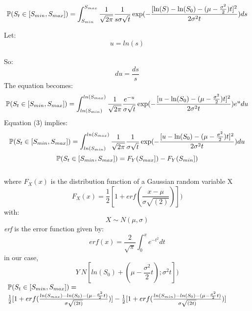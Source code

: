 \documentclass[12pt]{article}
\begin{document}
					\begin{equation}
						\mathbb{P}(S_t \in [S_{min},S_{max}]) = \int_{S_{min}}^{S_{max}} \frac{1}{\sqrt{2 \pi}} \frac{1}{s\sigma \sqrt{t}} \exp(-\frac{[\ln(S)-\ln(S_0)-
							(\mu-\frac{\sigma^2}{2})t]^2}{2 \sigma ^{2}t}) ds
					\end{equation}
					
					Let:  $$u = ln(s)$$\\
					So:  $$du = \frac{ds}{s}$$
					The equation becomes:
					\begin{equation}
					\mathbb{P}(S_t \in [S_{min},S_{max}]) = \int_{ln(S_{min})}^{ln(S_{max})} \frac{1}{\sqrt{2 \pi}} \frac{e^{-u}}{\sigma \sqrt{t}} \exp(-\frac{[u-\ln(S_0)-
						(\mu-\frac{\sigma^2}{2})t]^2}{2 \sigma ^{2}t}) e^{u}du
					\end{equation}
					Equation (3) implies:
					\begin{equation}
					\mathbb{P}(S_t \in [S_{min},S_{max}]) = \int_{ln(S_{min})}^{ln(S_{max})} \frac{1}{\sqrt{2 \pi}} \frac{1}{\sigma \sqrt{t}} \exp(-\frac{[u-\ln(S_0)-
						(\mu-\frac{\sigma^2}{2})t]^2}{2 \sigma ^{2}t}) du
					\end{equation}
					\begin{equation}
					\mathbb{P}(S_t \in [S_{min},S_{max}]) = F_{Y}(S_{max}]) - F_{Y}(S_{min}])
					\end{equation}
					\\
					where $F_{X}(x)$ is the distribution function of a Gaussian random variable X
					\begin{equation}
					F_{X}(x) = \frac{1}{2}[1 + erf(\frac{x - \mu}{\sigma \sqrt{(2)}})])
					\end{equation}
					with:
					 $$X \sim N(\mu,\sigma)$$
					{\it erf} is the error function given by:
					\begin{equation}
					erf(x) = \frac{2}{\sqrt{\pi}} \int_{0}^{x} e^{-t^{2}} dt
					\end{equation}
					in our case,
					\begin{equation}
					 Y~N[ln(S_{0}) + (\mu - \frac{\sigma^{2}}{2}t) ; \sigma^{2}t])
 					\end{equation}
 					$\begin{array}{lcl}
 						\mathbb{P}(S_t \in [S_{min},S_{max}]) =\\ \frac{1}{2}[1+erf(\frac{ln(S_{max})-ln(S_0)-(\mu-\frac{\sigma^2}{2}t)}{\sigma \sqrt{(2t)}})]-\frac{1}{2}[1+erf(\frac{ln(S_{min})-ln(S_0)-(\mu-\frac{\sigma^2}{2}t)}{\sigma \sqrt{(2t)}})]
 					\end{array}$
 				
\end{document}
